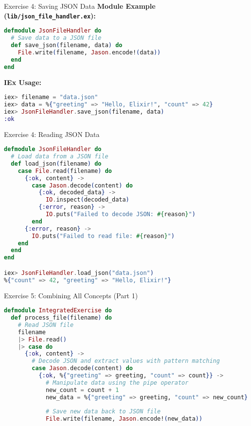 \documentclass[aspectratio=169, table]{beamer}
\begin{document}
\begin{frame}[fragile]{Exercise 4: Saving JSON Data}
\vspace{20pt}
\textbf{Module Example (\texttt{lib/json\_file\_handler.ex}):}
\begin{lstlisting}[language=Elixir, basicstyle=\ttfamily\scriptsize]
defmodule JsonFileHandler do
  # Save data to a JSON file
  def save_json(filename, data) do
    File.write(filename, Jason.encode!(data))
  end
end
\end{lstlisting}

\textbf{IEx Usage:}
\begin{lstlisting}[language=Elixir, basicstyle=\ttfamily\scriptsize]
iex> filename = "data.json"
iex> data = %{"greeting" => "Hello, Elixir!", "count" => 42}
iex> JsonFileHandler.save_json(filename, data)
:ok
\end{lstlisting}
\end{frame}


\begin{frame}[fragile]{Exercise 4: Reading JSON Data}
\vspace{20pt}
\begin{lstlisting}[language=Elixir, basicstyle=\ttfamily\scriptsize]
defmodule JsonFileHandler do
  # Load data from a JSON file
  def load_json(filename) do
    case File.read(filename) do
      {:ok, content} ->
        case Jason.decode(content) do
          {:ok, decoded_data} ->
            IO.inspect(decoded_data)
          {:error, reason} ->
            IO.puts("Failed to decode JSON: #{reason}")
        end
      {:error, reason} ->
        IO.puts("Failed to read file: #{reason}")
    end
  end
end

iex> JsonFileHandler.load_json("data.json")
%{"count" => 42, "greeting" => "Hello, Elixir!"}
\end{lstlisting}
\end{frame}


\begin{frame}[fragile]{Exercise 5: Combining All Concepts (Part 1)}
\vspace{20pt}
\begin{lstlisting}[language=Elixir, basicstyle=\ttfamily\footnotesize]
defmodule IntegratedExercise do
  def process_file(filename) do
    # Read JSON file
    filename
    |> File.read()
    |> case do
      {:ok, content} ->
        # Decode JSON and extract values with pattern matching
        case Jason.decode(content) do
          {:ok, %{"greeting" => greeting, "count" => count}} ->
            # Manipulate data using the pipe operator
            new_count = count + 1
            new_data = %{"greeting" => greeting, "count" => new_count}
			
            # Save new data back to JSON file
            File.write(filename, Jason.encode!(new_data))
\end{lstlisting}
\end{frame}
\end{document}
